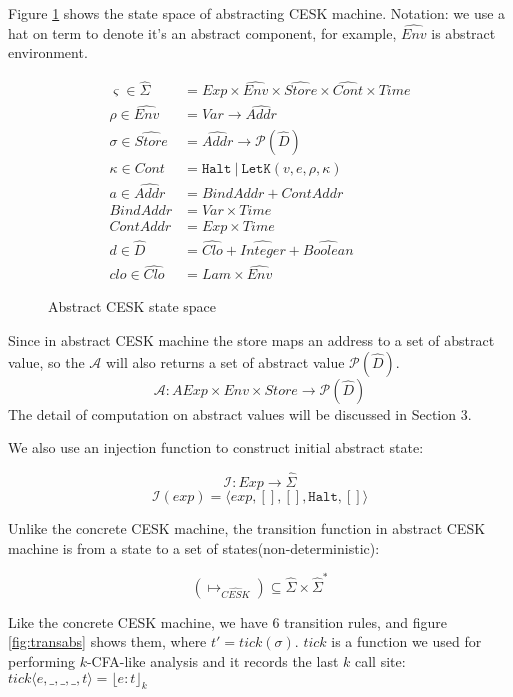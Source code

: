 \documentclass[paper=a4, fontsize=11pt]{scrartcl} %
\numberwithin{equation}{section} %
\numberwithin{figure}{section} %
\numberwithin{table}{section} %
\begin{document}
Figure \ref{fig:abstractcesk} shows the state space of abstracting CESK machine. Notation: we use a hat on term to denote it's an abstract component, for example, $\widehat{Env}$ is abstract environment.

\begin{figure}[h!]
\begin{align*}
\varsigma \in \widehat{\Sigma} & = Exp \times \widehat{Env} \times \widehat{Store} \times \widehat{Cont} \times Time \\
\rho \in \widehat{Env} & = Var \rightarrow \widehat{Addr} \\
\sigma \in \widehat{Store} & = \widehat{Addr} \rightarrow \mathcal{P}(\hat{D}) \\
\kappa \in Cont & = \texttt{Halt} ~|~ \texttt{LetK}(v,e,\rho,\kappa) \\
a \in \widehat{Addr} & = BindAddr + ContAddr \\
BindAddr &= Var \times Time \\
ContAddr &= Exp \times Time \\
d \in \hat{D} & = \widehat{Clo} + \widehat{Integer} + \widehat{Boolean} \\
clo \in \widehat{Clo} & = Lam \times \widehat{Env}
\end{align*}
\caption{Abstract CESK state space}
\label{fig:abstractcesk}
\end{figure}

Since in abstract CESK machine the store maps an address to a set of abstract value, so the $\mathcal{A}$ will also returns a set of abstract value $\mathcal{P}(\hat{D})$. 
$$ \mathcal{A} : AExp \times Env \times Store \rightarrow \mathcal{P}(\hat{D}) $$
The detail of computation on abstract values will be discussed in Section 3.

We also use an injection function to construct initial abstract state:

$$ \mathcal{I} : Exp \rightarrow \widehat{\Sigma} $$
$$ \mathcal{I}(exp) = \langle exp, [], [], \texttt{Halt}, [] \rangle $$

Unlike the concrete CESK machine, the transition function in abstract CESK machine is from a state to a set of states(non-deterministic):

$$(\longmapsto_{\widehat{CESK}}) \subseteq \widehat{\Sigma} \times \widehat{\Sigma}^{*}$$

Like the concrete CESK machine, we have 6 transition rules, and figure \ref{fig:transabs} shows them, where $t' = tick(\sigma)$. $tick$ is a function we used for performing $k$-CFA-like analysis and it records the last $k$ call site: $tick \langle e, \_, \_, \_, t \rangle = {\lfloor e : t \rfloor}_{k} $
\end{document}
